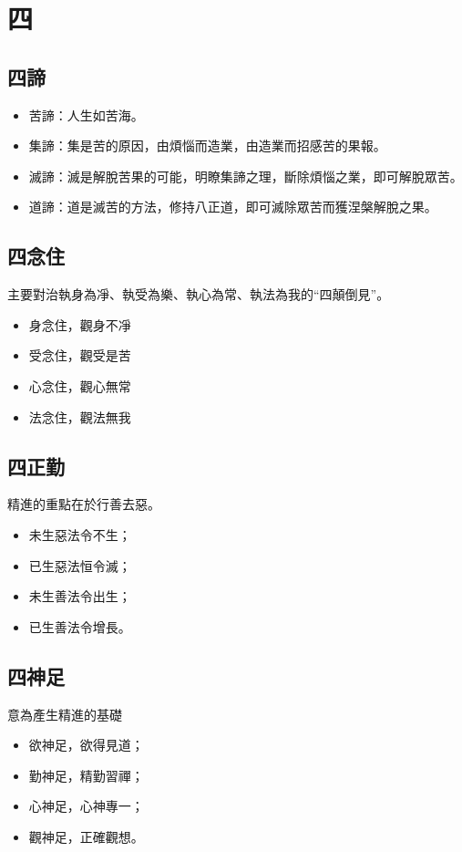 \section{四}

\subsection{四諦}
\begin{itemize}
  \item 苦諦：人生如苦海。
  \item 集諦：集是苦的原因，由煩惱而造業，由造業而招感苦的果報。
  \item 滅諦：滅是解脫苦果的可能，明瞭集諦之理，斷除煩惱之業，即可解脫眾苦。
  \item 道諦：道是滅苦的方法，修持八正道，即可滅除眾苦而獲涅槃解脫之果。
\end{itemize}

\subsection{四念住}
主要對治執身為凈、執受為樂、執心為常、執法為我的“四顛倒見”。
\begin{itemize}
  \item 身念住，觀身不凈
  \item 受念住，觀受是苦
  \item 心念住，觀心無常
  \item 法念住，觀法無我
\end{itemize}

\subsection{四正勤}
精進的重點在於行善去惡。
\begin{itemize}
  \item 未生惡法令不生；
  \item 已生惡法恒令滅；
  \item 未生善法令出生；
  \item 已生善法令增長。
\end{itemize}


\subsection{四神足}
意為產生精進的基礎
\begin{itemize}
  \item 欲神足，欲得見道；
  \item 勤神足，精勤習禪；
  \item 心神足，心神專一；
  \item 觀神足，正確觀想。
\end{itemize}
